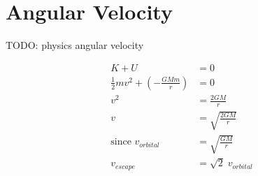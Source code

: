 \section{Angular Velocity} \label{18/11/2024} TODO: physics angular velocity

\begin{align*}
	K + U &= 0 \\
	\frac{1}{2}mv^2 + (-\frac{GMm}{r}) &= 0 \\
	v^2 &= \frac{2GM}{r} \\
	v &= \sqrt{\frac{2GM}{r}} \\
	\text{since } v_{orbital} &= \sqrt{\frac{GM}{r}} \\
	v_{escape} &= \sqrt{2}\;v_{orbital}
\end{align*}